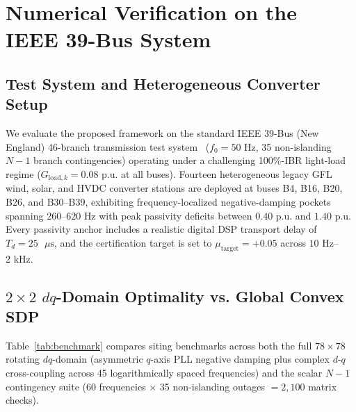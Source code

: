 \documentclass[10pt,twocolumn]{article}
\begin{document}
\section{Numerical Verification on the IEEE 39-Bus System}

\subsection{Test System and Heterogeneous Converter Setup}
We evaluate the proposed framework on the standard IEEE 39-Bus (New England) 46-branch transmission test system~\cite{athay1979practical} ($f_0=50\text{ Hz}$, 35 non-islanding $N-1$ branch contingencies) operating under a challenging 100\%-IBR light-load regime ($G_{\text{load},k}=0.08\text{ p.u.}$ at all buses). Fourteen heterogeneous legacy GFL wind, solar, and HVDC converter stations are deployed at buses B4, B16, B20, B26, and B30--B39, exhibiting frequency-localized negative-damping pockets spanning $260$--$620\text{ Hz}$ with peak passivity deficits between $0.40\text{ p.u.}$ and $1.40\text{ p.u.}$ Every passivity anchor includes a realistic digital DSP transport delay of $T_d=25\text{ }\mu\text{s}$, and the certification target is set to $\mu_{\text{target}}=+0.05$ across $10\text{ Hz}$--$2\text{ kHz}$.

\subsection{$2\times 2$ $dq$-Domain Optimality vs. Global Convex SDP}
Table~\ref{tab:benchmark} compares siting benchmarks across both the full $78\times 78$ rotating $dq$-domain (asymmetric $q$-axis PLL negative damping plus complex $d$-$q$ cross-coupling across 45 logarithmically spaced frequencies) and the scalar $N-1$ contingency suite (60 frequencies $\times$ 35 non-islanding outages $=2,100$ matrix checks).
\end{document}

